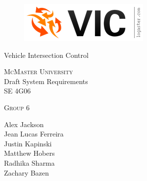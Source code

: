 \documentclass [12pt]{article}
\begin{document}
\begin {center} 

\thispagestyle{empty}
\vspace*{4.5cm}

\begin {figure}[h!]
\centering
\hspace{-10mm}\includegraphics [scale = .5, trim={.4cm 0 .8cm 0},clip] {figures/vic_logo.png}
\end {figure}

{\fontfamily{\cabinfamily}\selectfont
\Huge{Vehicle Intersection Control} }

\vspace{1 cm}
{\Large{\textsc{McMaster University}}\\}  \vspace {1cm}
{\large Draft System Requirements\\ \vspace {0.4 cm} SE 4G06}  \vspace {1cm}

{\large \textsc{Group 6} \\} \vspace{1cm}

{
Alex Jackson \\
Jean Lucas Ferreira \\
Justin Kapinski\\
Matthew Hobers\\
Radhika Sharma\\
Zachary Bazen}




\end{center}


\pagebreak


\tableofcontents
\listoftables

\pagebreak

\end{document}

